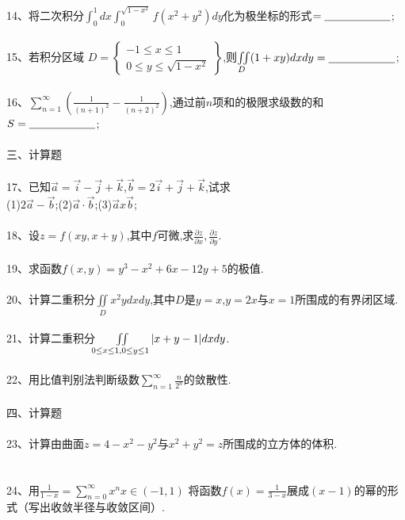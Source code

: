 \documentclass[12pt,a3paper]{article}
\begin{document}
\\\\
14、将二次积分$\int_0^1dx\int_0^{\sqrt{1-x^2}}f(x^2+y^2)dy$化为极坐标的形式$=\underline{\makebox[6em]{}}$;
\\\\
15、若积分区域
$D = \left.
\begin{cases}
  -1 \leq x \leq 1 \\
  0 \leq y \leq \sqrt{1-x^2}
\end{cases}
\right\}
$,则$\iint\limits_D (1+xy)dxdy=\underline{\makebox[6em]{}}$;
\\\\
16、$\sum\limits_{n=1}^\infty(\frac{1}{(n+1)^2}-\frac{1}{(n+2)^2})$,通过前$n$项和的极限求级数的和$S=\underline{\makebox[6em]{}}$;
\\\\
三、计算题
\\\\
17、已知$\vec{a}=\vec{i}-\vec{j}+\vec{k}$,$\vec{b}=2\vec{i}+\vec{j}+\vec{k}$,试求\\
(1)$2\vec{a}-\vec{b}$;(2)$\vec{a}\cdot\vec{b}$;(3)$\vec{a}x\vec{b}$;
\\\\
18、设$z=f(xy,x+y)$,其中$f$可微,求$\frac{\partial z}{\partial x}, \frac{\partial z}{\partial y}$.
\\\\
19、求函数$f(x,y)=y^3-x^2+6x-12y+5$的极值.
\\\\
20、计算二重积分$\iint\limits_D x^2ydxdy$,其中$D$是$y=x$,$y=2x$与$x=1$所围成的有界闭区域.
\\\\
21、计算二重积分$\iint\limits_{0\leq x\leq 1, \\0\leq y\leq 1}|x+y-1|dxdy$.
\\\\
22、用比值判别法判断级数$\sum\limits_{n=1}^\infty\frac{n}{2^n}$的敛散性.
\\\\
四、计算题
\\\\
23、计算由曲面$z=4-x^2-y^2$与$x^2+y^2=z$所围成的立方体的体积.
\\\\\\
24、用$\frac{1}{1-x}=\sum\limits_{n=0}^\infty x^n x\in (-1,1)$ 将函数$f(x)=\frac{1}{3-x}$展成$(x-1)$的幂的形式（写出收敛半径与收敛区间）.
\end{document}
